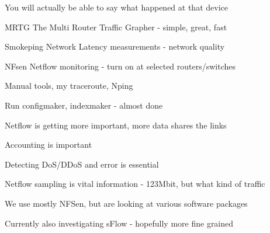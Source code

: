 \documentclass[28pt,landscape,a4paper,footrule]{foils}
\begin{document}
\centerline{You will actually be able to say what happened at that device}


\begin{slidelist}
\item MRTG The Multi Router Traffic Grapher - simple, great, fast\\
\item Smokeping Network Latency measurements - network quality\\
\item NFsen Netflow monitoring - turn on at selected routers/switches
\item Manual tools, my traceroute, Nping
\end{slidelist}



\centerline{Run configmaker, indexmaker - almost done}






\begin{slidelist}
\item Netflow is getting more important, more data shares the links
\item Accounting is important
\item Detecting DoS/DDoS and error is essential
\item Netflow sampling is vital information - 123Mbit, but what kind of traffic 
\item We use mostly NFSen, but are looking at various software packages
\item Currently also investigating sFlow - hopefully more fine grained
\end{slidelist}





\end{document}
